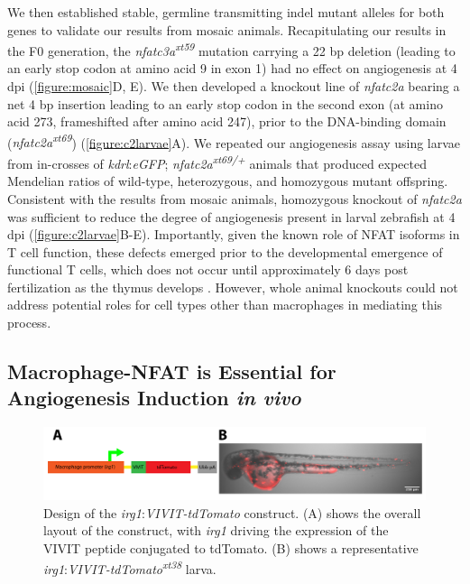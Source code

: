 We then established stable, germline transmitting indel mutant alleles for both genes to validate our results from mosaic animals. Recapitulating our results in the F0 generation, the \textit{nfatc3a\textsuperscript{xt59}} mutation carrying a 22 bp deletion (leading to an early stop codon at amino acid 9 in exon 1) had no effect on angiogenesis at 4 dpi (\autoref{figure:mosaic}D, E). We then developed a knockout line of \textit{nfatc2a} bearing a net 4 bp insertion leading to an early stop codon in the second exon (at amino acid 273, frameshifted after amino acid 247), prior to the DNA-binding domain (\textit{nfatc2a\textsuperscript{xt69}}) (\autoref{figure:c2larvae}A). We repeated our angiogenesis assay using larvae from in-crosses of \textit{kdrl}:\textit{eGFP}; \textit{nfatc2a\textsuperscript{xt69/+}} animals that produced expected Mendelian ratios of wild-type, heterozygous, and homozygous mutant offspring. Consistent with the results from mosaic animals, homozygous knockout of \textit{nfatc2a} was sufficient to reduce the degree of angiogenesis present in larval zebrafish at 4 dpi (\autoref{figure:c2larvae}B-E). Importantly, given the known role of NFAT isoforms in T cell function, these defects emerged prior to the developmental emergence of functional T cells, which does not occur until approximately 6 days post fertilization as the thymus develops \citep{Trede2004}. However, whole animal knockouts could not address potential roles for cell types other than macrophages in mediating this process. 

\subsection{Macrophage-NFAT is Essential for Angiogenesis Induction \textit{in vivo}}

\begin{figure}
\centering
\includegraphics[width=\textwidth]{images/vivitconstruct.pdf}
\caption{Design of the \textit{irg1}:\textit{VIVIT-tdTomato} construct. (A) shows the overall layout of the construct, with \textit{irg1} driving the expression of the VIVIT peptide conjugated to tdTomato. (B) shows a representative \textit{irg1}:\textit{VIVIT-tdTomato\textsuperscript{xt38}} larva.}
\label{figure:vivitdiagram}
\end{figure}

